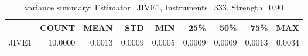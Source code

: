 \begin{table}[ht]
\centering
\caption{variance summary: Estimator=JIVE1, Instruments=333, Strength=0.90}
\begin{tabular}{lrrrrrrrr}
\toprule
 & COUNT & MEAN & STD & MIN & 25\% & 50\% & 75\% & MAX \\
\midrule
JIVE1 & 10.0000 & 0.0013 & 0.0009 & 0.0005 & 0.0009 & 0.0009 & 0.0013 & 0.0034 \\
\bottomrule
\end{tabular}
\end{table}
